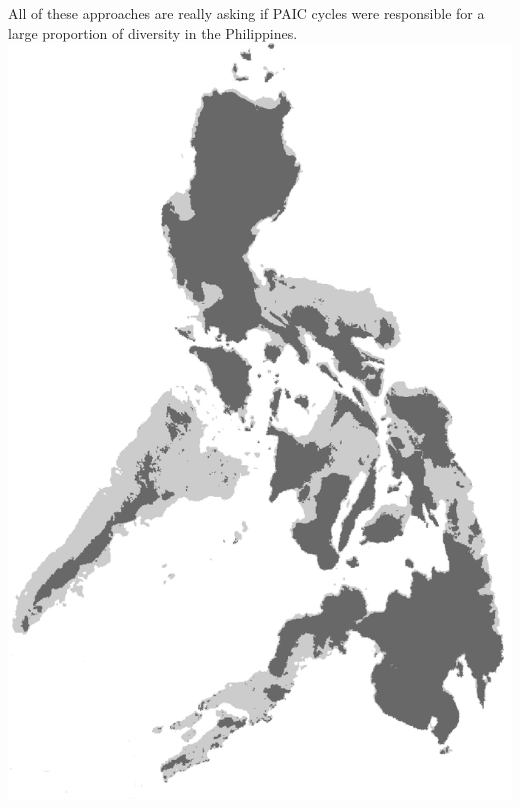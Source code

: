 \begin{frame}
\begin{columns}[c]
            All of these approaches are really asking if PAIC cycles were
            responsible for a large proportion of diversity in the Philippines.
            \includegraphics[width=\textwidth]{images/maps/Philippines.png}
    \end{columns}
\end{frame}

